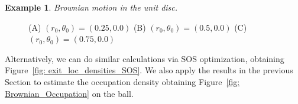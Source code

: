 \documentclass[12pt]{amsart}
\theoremstyle{definition}
\newtheorem{examplex}[lemma]{Example}
\begin{document}
\begin{examplex} {\it Brownian motion in the unit disc.}
\begin{figure}
    \centering
    \caption{(A) $(r_0,\theta_0)=(0.25,0.0)$ (B) $(r_0,\theta_0)=(0.5,0.0)$ (C) $(r_0,\theta_0)=(0.75,0.0)$}
    \label{fig: exit_loc_densities}
\end{figure}

Alternatively, we can do similar calculations via SOS optimization, obtaining Figure~\ref{fig: exit_loc_densities_SOS}. We also apply the results in the previous Section to estimate the occupation density obtaining Figure~\ref{fig: Brownian_Occupation} on the ball.


\end{examplex}
\end{document}
